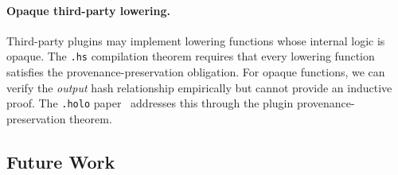 \documentclass[sigconf,nonacm]{acmart}
\newcommand{\hscore}{\texttt{.hs}}
\newcommand{\holo}{\texttt{.holo}}
\begin{document}
\paragraph{Opaque third-party lowering.}
Third-party plugins may implement lowering functions whose
internal logic is opaque. The \hscore{} compilation theorem
requires that every lowering function satisfies the
provenance-preservation obligation. For opaque functions,
we can verify the \emph{output} hash relationship
empirically but cannot provide an inductive proof. The
\holo{} paper~\cite{paper-12-holo-i3d2027} addresses this
through the plugin provenance-preservation theorem.

\subsection{Future Work}
\end{document}
